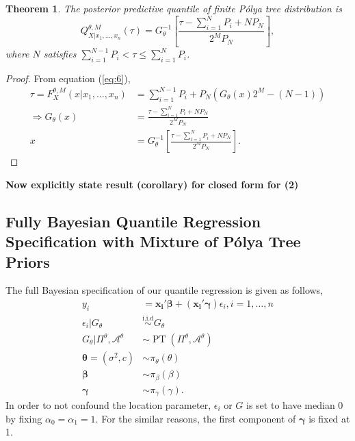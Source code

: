\documentclass[12pt]{article}
\newtheorem{thm}{Theorem}[subsection]
\newcommand{\polya}{P\'{o}lya}
\newcommand{\iid}{\stackrel{\text{i.i.d}}{\sim}}
\DeclareMathOperator{\pt}{PT}
\begin{document}
\begin{thm}
  The posterior predictive quantile of finite \polya{} tree
  distribution is 
  \begin{equation}
    \label{eq:7}
    Q^{\theta, M}_{X|x_1, \ldots, x_n}(\tau) = G^{-1}_{\theta} \left[
      \frac{\tau- \sum_{i=1}^N P_i + N P_N}{2^M P_N} \right],
  \end{equation}
  where $N$ satisfies $ \sum_{i=1}^{N-1} P_i < \tau \le \sum_{i=1}^N P_i$.
\end{thm}

\begin{proof}
  From equation (\ref{eq:6}), 
  \begin{align*}
    \tau = F^{\theta,M}_X(x|x_1, \ldots, x_n) &= \sum_{i=1}^{N-1} P_{i} + P_N
    \left( G_{\theta}(x)2^M -(N-1) \right) \\
    \Rightarrow G_{\theta}(x) &= \frac{\tau - \sum_{i=1}^NP_i +
      NP_N}{2^MP_N} \\
    x & = G_{\theta}^{-1} \left[\frac{\tau - \sum_{i=1}^NP_i +
        NP_N}{2^MP_N}  \right].
  \end{align*}
\end{proof}
{\bf Now explicitly state result (corollary) for closed form for (2)}

\subsection{Fully Bayesian Quantile Regression Specification with Mixture of \polya{}
  Tree Priors}
The full Bayesian specification of our quantile regression is given as
follows, 
\begin{align*}
  y_i& = \bm{x_i'\beta} + (\bm{x_i'\gamma}) \epsilon_{i}, i = 1, \ldots,
  n \\
  \epsilon_i |G_{\theta} & \iid G_{\theta} \\
  G_{\theta}|\Pi^{\theta}, \mathcal{A}^{\theta} & \sim \pt
  (\Pi^{\theta}, \mathcal{A}^{\theta}) \\
  \bm{\theta} = (\sigma^2, c) & \sim \pi_{\theta}(\theta) \\
  \bm{\beta} & \sim \pi_{\beta}(\beta)\\
  \bm{\gamma} &\sim \pi_{\gamma}(\gamma).
\end{align*} 
In order to not confound the location parameter, $\epsilon_i $ or $G$
is set to have median 0 by fixing $\alpha_0=\alpha_1 = 1$. For the
similar reasons,
the first component of $\bm{\gamma}$ is fixed
at 1. 
\end{document}
